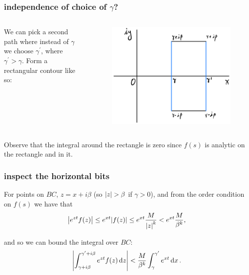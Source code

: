 \documentclass[mathserif]{beamer}
\begin{document}
\begin{frame}
  \frametitle{independence of choice of $\gamma$?}

  

  \begin{columns}

    We can pick a second path where instead of $\gamma$ we choose $\gamma^{\prime}$, where $\gamma^{\prime}> \gamma$. Form a rectangular contour like so:
    \begin{figure}[h]
      \centering
      \includegraphics[scale=0.25]{2}
    \end{figure}
  \end{columns}

  Observe that the integral around the rectangle is zero since $f(s)$ is analytic on the rectangle and in it.

\end{frame}

\begin{frame}
  \frametitle{inspect the horizontal bits}

  For points on $BC$, $z = x+i\beta$ (so $\abs{z} > \beta$ if $\gamma > 0$), and from the order condition on $f(s)$ we have that \[\abs{e^{zt}f(z)}\leq e^{xt}\abs{f(z)}\leq e^{xt}\frac{M}{\abs{z}^k} < e^{xt}\frac{M}{\beta^k},\]

  and so we can bound the integral over $BC$: \[\abs{\int_{\gamma+i\beta}^{\gamma^{\prime}+i\beta}e^{zt}f(z)\dd{z}} < \frac{M}{\beta^k}\int_{\gamma}^{\gamma^{\prime}}e^{xt}\dd{x}.\]

\end{frame}
\end{document}
